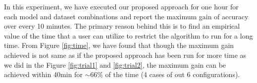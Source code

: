 In this experiment, we have executed our proposed approach for one hour for each model and dataset combinations and report the maximum gain of accuracy over every 10 minutes. The primary reason behind this is to find an empirical value of the time that a user can utilize to restrict the algorithm to run for a long time. From Figure \ref{fig:time}, we have found that though the maximum gain achieved is not same as if the proposed approach has been run for more time as we did in the Figure \ref{fig:trial1} and \ref{fig:trial2}, the maximum gain can be achieved within 40min for $\sim$66\% of the time (4 cases of out 6 configurations). 

